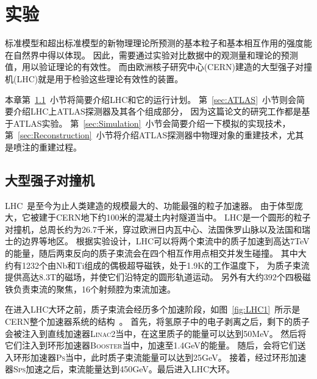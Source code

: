 

\chapter{实验}
\label{cha:EXP}

标准模型和超出标准模型的新物理理论所预测的基本粒子和基本相互作用的强度能在自然界中得以体现。
因此，需要通过实验对比数据中的观测量和理论的预测值，用以验证理论的有效性。
而由欧洲核子研究中心(CERN)建造的大型强子对撞机(LHC)就是用于检验这些理论有效性的装置。

本章第~\ref{sec:LHC}~小节将简要介绍LHC和它的运行计划。
第~\ref{sec:ATLAS}~小节则会简要介绍LHC上ATLAS探测器及其各个组成部分，
因为这篇论文的研究工作都是基于ATLAS实验。
第~\ref{sec:Simulation}~小节会简要介绍一下模拟的实现技术，
第~\ref{sec:Reconstruction}~小节将介绍ATLAS探测器中物理对象的重建技术，尤其是喷注的重建过程。

\section{大型强子对撞机}
\label{sec:LHC}

LHC~\cite{Evans:2008zzb}是至今为止人类建造的规模最大的、功能最强的粒子加速器。
由于体型庞大，它被建于CERN地下约100米的混凝土内衬隧道当中。
LHC是一个圆形的粒子对撞机，总周长约为26.7千米，穿过欧洲日内瓦中心、法国侏罗山脉以及法国和瑞士的边界等地区。
根据实验设计，LHC可以将两个束流中的质子加速到高达7TeV的能量，随后两束反向的质子束流会在四个相互作用点相交并发生碰撞。
其中大约有1232个由Nb和Ti组成的偶极超导磁铁，处于1.9K的工作温度下，
为质子束流提供高达8.3T的磁场，并使它们沿特定的圆形轨道运动。
另外有大约392个四极磁铁负责束流的聚焦，16个射频腔为束流加速。

在进入LHC大环之前，质子束流会经历多个加速阶段，如图~\ref{fig:LHC1}~所示是CERN整个加速器系统的结构~\cite{LHCImage1}。
首先，将氢原子中的电子剥离之后，剩下的质子会被注入到直线加速器\textsc{Linac2}当中，在这里质子的能量可以达到50MeV。
然后将它们注入到环形加速器\textsc{Booster}当中，加速至1.4GeV的能量。
随后，会将它们送入环形加速器\textsc{Ps}当中，此时质子束流能量可以达到25GeV。
接着，经过环形加速器\textsc{Sps}加速之后，束流能量达到450GeV。最后进入LHC大环。

